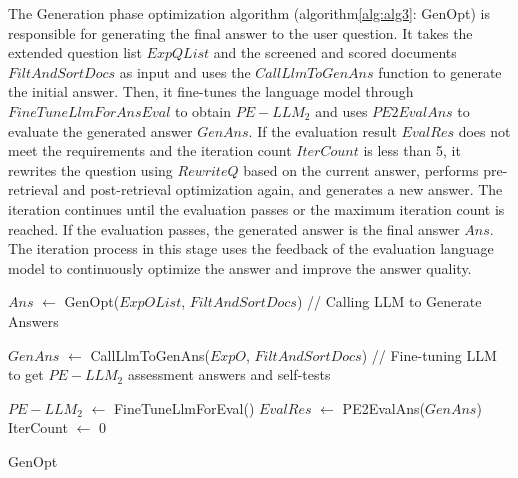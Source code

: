 The Generation phase optimization algorithm (algorithm\ref{alg:alg3}: GenOpt) is responsible for generating the final answer to the user question. It takes the extended question list $ExpQList$ and the screened and scored documents $FiltAndSortDocs$ as input and uses the $CallLlmToGenAns$ function to generate the initial answer. Then, it fine-tunes the language model through $FineTuneLlmForAnsEval$ to obtain $PE-LLM_2$ and uses $PE2EvalAns$ to evaluate the generated answer $GenAns$. If the evaluation result $EvalRes$ does not meet the requirements and the iteration count $IterCount$ is less than 5, it rewrites the question using $RewriteQ$ based on the current answer, performs pre-retrieval and post-retrieval optimization again, and generates a new answer. The iteration continues until the evaluation passes or the maximum iteration count is reached. If the evaluation passes, the generated answer is the final answer $Ans$. The iteration process in this stage uses the feedback of the evaluation language model to continuously optimize the answer and improve the answer quality.
\begin{algorithm}[h]
\label{alg:alg3}
\SetAlgoLined
{}
\BlankLine
$Ans$ $\leftarrow$ GenOpt($ExpOList$, $FiltAndSortDocs$)\;
\BlankLine
// {Calling LLM to Generate Answers}

$GenAns$ $\leftarrow$ CallLlmToGenAns($ExpO$, $FiltAndSortDocs$)\;
\BlankLine
// {Fine-tuning LLM to get $PE-LLM_2$ assessment answers and self-tests}

$PE-LLM_2$ $\leftarrow$ FineTuneLlmForEval()\;
\BlankLine
$EvalRes$ $\leftarrow$ PE2EvalAns($GenAns$)\;
\BlankLine
IterCount $\leftarrow$ 0\;
\;
\caption{GenOpt}
\end{algorithm}




